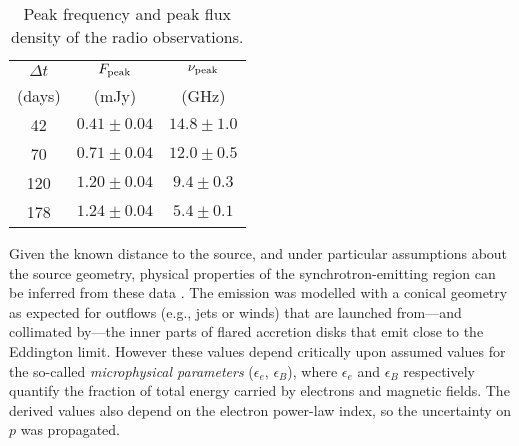 \begin{table}
	\centering
	\begin{tabular}{| c| c c |}
		\hline
		$\Delta t$ & $F_{\textup{peak}}$ & $\nu_{\textup{peak}}$ \\ 
		  (days) & (mJy) &  (GHz)  \\
		\hline
		42 & $ 0.41\pm0.04$ & $ 14.8\pm1.0$ \\ 
		70 & $ 0.71\pm0.04$ & $ 12.0\pm0.5$ \\ 
		120 & $ 1.20\pm0.04$ & $  9.4\pm0.3$ \\ 
		178 & $ 1.24\pm0.04$ & $  5.4\pm0.1$ \\ 
		\hline
	\end{tabular}
	 \caption{Peak frequency and peak flux density of the radio observations.}
	\label{tab:syncobs}
\end{table}

%

Given the known distance to the source, and under particular assumptions about the source geometry, physical properties of the synchrotron-emitting region can be inferred from these data . The emission was modelled with a  conical geometry as expected for outflows (e.g., jets or winds) that are launched from---and collimated by---the inner parts of flared accretion disks that emit close to the Eddington limit. However these values depend critically upon assumed values for the so-called \emph{microphysical parameters} ($\epsilon_e$, $\epsilon_B$), where $\epsilon_e$ and $\epsilon_B$ respectively quantify the fraction of total energy carried by electrons and magnetic fields.  The derived values also depend on the electron power-law index, so the uncertainty on $p$ was propagated. 

